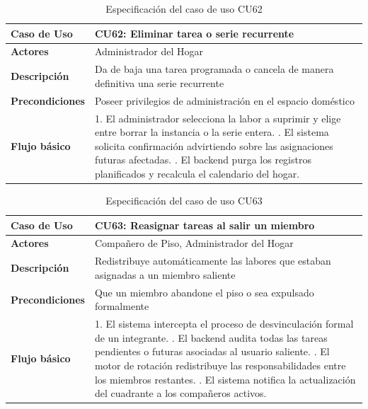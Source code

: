 \begin{table}[H]
\centering
\begin{tabular}{|p{3.2cm}|p{11.3cm}|}
\hline
\textbf{Caso de Uso} & \textbf{CU62: Eliminar tarea o serie recurrente} \\ \hline
\textbf{Actores} & Administrador del Hogar \\ \hline
\textbf{Descripción} & Da de baja una tarea programada o cancela de manera definitiva una serie recurrente \\ \hline
\textbf{Precondiciones} & Poseer privilegios de administración en el espacio doméstico \\ \hline
\textbf{Flujo básico} & 
1. El administrador selecciona la labor a suprimir y elige entre borrar la instancia o la serie entera. \newline
2. El sistema solicita confirmación advirtiendo sobre las asignaciones futuras afectadas. \newline
3. El backend purga los registros planificados y recalcula el calendario del hogar. \\ \hline
\end{tabular}
\caption{Especificación del caso de uso CU62}
\label{tab:cu62}
\end{table}

\begin{table}[H]
\centering
\begin{tabular}{|p{3.2cm}|p{11.3cm}|}
\hline
\textbf{Caso de Uso} & \textbf{CU63: Reasignar tareas al salir un miembro} \\ \hline
\textbf{Actores} & Compañero de Piso, Administrador del Hogar \\ \hline
\textbf{Descripción} & Redistribuye automáticamente las labores que estaban asignadas a un miembro saliente \\ \hline
\textbf{Precondiciones} & Que un miembro abandone el piso o sea expulsado formalmente \\ \hline
\textbf{Flujo básico} & 
1. El sistema intercepta el proceso de desvinculación formal de un integrante. \newline
2. El backend audita todas las tareas pendientes o futuras asociadas al usuario saliente. \newline
3. El motor de rotación redistribuye las responsabilidades entre los miembros restantes. \newline
4. El sistema notifica la actualización del cuadrante a los compañeros activos. \\ \hline
\end{tabular}
\caption{Especificación del caso de uso CU63}
\label{tab:cu63}
\end{table}